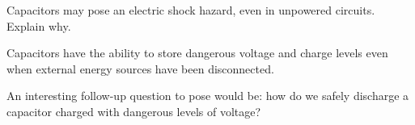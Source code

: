 

Capacitors may pose an electric shock hazard, even in unpowered circuits.  Explain why.







Capacitors have the ability to store dangerous voltage and charge levels even when external energy sources have been disconnected.







An interesting follow-up question to pose would be: how do we safely discharge a capacitor charged with dangerous levels of voltage?





